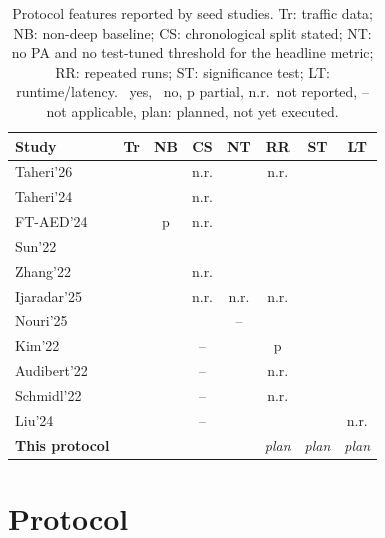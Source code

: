\documentclass[conference]{IEEEtran}
\newcommand{\cm}{\ding{51}}          %
\newcommand{\xm}{\ding{55}}          %
\newcommand{\nr}{n.r.}               %
\newcommand{\pl}{\textit{plan}}         %
\begin{document}
\begin{table}[t]
\centering
\caption{Protocol features reported by seed studies.
Tr: traffic data; NB: non-deep baseline; CS: chronological split stated;
NT: no PA and no test-tuned threshold for the headline metric; RR: repeated
runs; ST: significance test; LT: runtime/latency.
\cm\ yes, \xm\ no, p partial, \nr\ not reported, -- not applicable,
plan: planned, not yet executed.}
\label{tab:practices}
\setlength{\tabcolsep}{3.2pt}
\renewcommand{\arraystretch}{0.9}
\footnotesize
\begin{tabular}{@{}lccccccc@{}}
\toprule
Study & Tr & NB & CS & NT & RR & ST & LT \\
\midrule
Taheri'26 \cite{taheri2026applicability} & \cm & \cm & \nr & \xm & \nr & \xm & \xm \\
Taheri'24 \cite{taheri2024tpfds}         & \cm & \cm & \nr & \xm & \cm & \xm & \xm \\
FT-AED'24 \cite{coursey2024ftaed}        & \cm & p   & \nr & \cm & \xm & \xm & \xm \\
Sun'22 \cite{sun2022datacentric}         & \cm & \xm & \cm & \cm & \cm & \xm & \xm \\
Zhang'22 \cite{zhang2022automatic}       & \cm & \cm & \nr & \cm & \xm & \xm & \xm \\
Ijaradar'25 \cite{ijaradar2025datadriven}& \cm & \cm & \nr & \nr & \nr & \xm & \xm \\
Nouri'25 \cite{nouri2025sidmseq}         & \cm & \xm & \cm & --  & \xm & \xm & \cm \\
Kim'22 \cite{kim2022rigorous}            & \xm & \cm & --  & \xm & p   & \xm & \xm \\
Audibert'22 \cite{audibert2022deep}      & \xm & \cm & --  & \xm & \nr & \cm & \xm \\
Schmidl'22 \cite{schmidl2022anomaly}     & \xm & \cm & --  & \cm & \nr & \xm & \cm \\
Liu'24 \cite{liu2024elephant}            & \xm & \cm & --  & \cm & \xm & \cm & \nr \\
\midrule
\textbf{This protocol}                   & \cm & \cm & \cm & \cm & \pl & \pl & \pl \\
\bottomrule
\end{tabular}
\end{table}

\section{Protocol}
\end{document}
